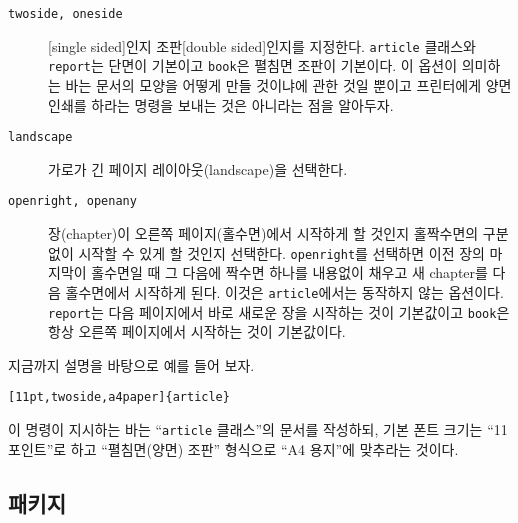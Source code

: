 \begin{table}[!bp]
\begin{lined}{\textwidth}
\begin{description}
\item[\normalfont\texttt{twoside, oneside}] \quad 
  [single sided]인지  조판[double sided]인지를 지정한다. \texttt{article} 클래스와 \texttt{report}는
  단면이 기본이고 \texttt{book}은 펼침면 조판이 기본이다.
  이 옵션이 의미하는 바는 문서의 모양을 어떻게 만들 것이냐에 관한 것일 뿐이고 
  프린터에게 양면인쇄를 하라는 명령을 보내는 것은 아니라는 점을 알아두자.
\item[\normalfont\texttt{landscape}] \quad 
  가로가 긴 페이지 레이아웃(landscape)을 선택한다.
\item[\normalfont\texttt{openright, openany}] \quad 
  장(chapter)이 오른쪽 페이지(홀수면)에서 시작하게 할 것인지 홀짝수면의 구분 없이
  시작할 수 있게 할 것인지 선택한다. \texttt{openright}를 선택하면 이전 장의 마지막이 홀수면일 때
  그 다음에 짝수면 하나를 내용없이 채우고 새 chapter를 다음 홀수면에서 시작하게 된다.
  이것은 \texttt{article}에서는 동작하지 않는 옵션이다. \texttt{report}는 다음 페이지에서
  바로 새로운 장을 시작하는 것이 기본값이고 \texttt{book}은 항상 오른쪽 페이지에서 시작하는 것이
  기본값이다.

\end{description}
\end{lined}
\end{table}



지금까지 설명을 바탕으로 예를 들어 보자.
\begin{code}
\verb|[11pt,twoside,a4paper]{article}|
\end{code}
이 명령이 지시하는 바는 ``\texttt{article} 클래스''의 문서를 작성하되, 기본 폰트 크기는 ``11포인트''로 하고 
``펼침면(양면) 조판'' 형식으로 ``A4 용지''에 맞추라는 것이다.

\subsection{패키지} 


